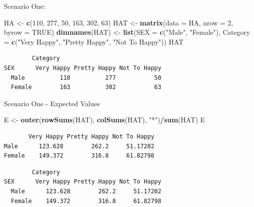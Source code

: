 \documentclass[
  ignorenonframetext,
]{beamer}
\newenvironment{Shaded}{\begin{snugshade}}{\end{snugshade}}
\newcommand{\AttributeTok}[1]{\textcolor[rgb]{0.13,0.29,0.53}{#1}}
\newcommand{\CommentTok}[1]{\textcolor[rgb]{0.56,0.35,0.01}{\textit{#1}}}
\newcommand{\ConstantTok}[1]{\textcolor[rgb]{0.56,0.35,0.01}{#1}}
\newcommand{\DecValTok}[1]{\textcolor[rgb]{0.00,0.00,0.81}{#1}}
\newcommand{\FunctionTok}[1]{\textcolor[rgb]{0.13,0.29,0.53}{\textbf{#1}}}
\newcommand{\NormalTok}[1]{#1}
\newcommand{\OtherTok}[1]{\textcolor[rgb]{0.56,0.35,0.01}{#1}}
\newcommand{\SpecialCharTok}[1]{\textcolor[rgb]{0.81,0.36,0.00}{\textbf{#1}}}
\newcommand{\StringTok}[1]{\textcolor[rgb]{0.31,0.60,0.02}{#1}}
\begin{document}
\begin{frame}[fragile]{Scenario One:}
\label{scenario-one-1}
\begin{Shaded}
\begin{Highlighting}[]
\NormalTok{HA }\OtherTok{\textless{}{-}} \FunctionTok{c}\NormalTok{(}\DecValTok{110}\NormalTok{, }\DecValTok{277}\NormalTok{, }\DecValTok{50}\NormalTok{, }\DecValTok{163}\NormalTok{, }\DecValTok{302}\NormalTok{, }\DecValTok{63}\NormalTok{)}
\NormalTok{HAT }\OtherTok{\textless{}{-}} \FunctionTok{matrix}\NormalTok{(}\AttributeTok{data =}\NormalTok{ HA, }\AttributeTok{nrow =} \DecValTok{2}\NormalTok{, }\AttributeTok{byrow =} \ConstantTok{TRUE}\NormalTok{)}
\FunctionTok{dimnames}\NormalTok{(HAT) }\OtherTok{\textless{}{-}} \FunctionTok{list}\NormalTok{(}\AttributeTok{SEX =} \FunctionTok{c}\NormalTok{(}\StringTok{"Male"}\NormalTok{, }\StringTok{"Female"}\NormalTok{),}
 \AttributeTok{Category =} \FunctionTok{c}\NormalTok{(}\StringTok{"Very Happy"}\NormalTok{, }\StringTok{"Pretty Happy"}\NormalTok{, }\StringTok{"Not To Happy"}\NormalTok{))}
\NormalTok{HAT}
\end{Highlighting}
\end{Shaded}

\begin{verbatim}
        Category
SEX      Very Happy Pretty Happy Not To Happy
  Male          110          277           50
  Female        163          302           63
\end{verbatim}
\end{frame}

\begin{frame}[fragile]{Scenario One - Expected Values}
\label{scenario-one---expected-values}
\begin{Shaded}
\begin{Highlighting}[]
\NormalTok{E }\OtherTok{\textless{}{-}} \FunctionTok{outer}\NormalTok{(}\FunctionTok{rowSums}\NormalTok{(HAT), }\FunctionTok{colSums}\NormalTok{(HAT), }\StringTok{"*"}\NormalTok{)}\SpecialCharTok{/}\FunctionTok{sum}\NormalTok{(HAT)}
\NormalTok{E}
\end{Highlighting}
\end{Shaded}

\begin{verbatim}
       Very Happy Pretty Happy Not To Happy
Male      123.628        262.2     51.17202
Female    149.372        316.8     61.82798
\end{verbatim}

\begin{Shaded}
\end{Shaded}

\begin{verbatim}
        Category
SEX      Very Happy Pretty Happy Not To Happy
  Male      123.628        262.2     51.17202
  Female    149.372        316.8     61.82798
\end{verbatim}
\end{frame}
\end{document}
